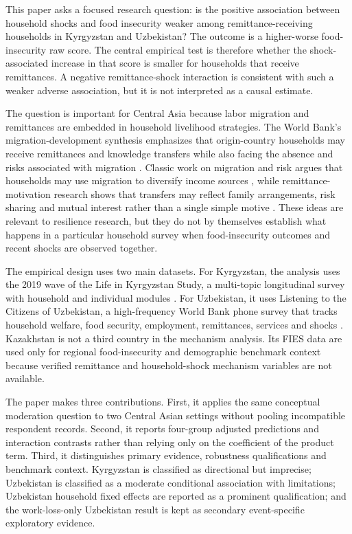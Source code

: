 \documentclass[11pt]{article}
\begin{document}
This paper asks a focused research question: is the positive association between household shocks and food insecurity weaker among remittance-receiving households in Kyrgyzstan and Uzbekistan? The outcome is a higher-worse food-insecurity raw score. The central empirical test is therefore whether the shock-associated increase in that score is smaller for households that receive remittances. A negative remittance-shock interaction is consistent with such a weaker adverse association, but it is not interpreted as a causal estimate.

The question is important for Central Asia because labor migration and remittances are embedded in household livelihood strategies. The World Bank's migration-development synthesis emphasizes that origin-country households may receive remittances and knowledge transfers while also facing the absence and risks associated with migration \parencite{WorldBank2023}. Classic work on migration and risk argues that households may use migration to diversify income sources \parencite{StarkLevhari1982}, while remittance-motivation research shows that transfers may reflect family arrangements, risk sharing and mutual interest rather than a single simple motive \parencite{LucasStark1985}. These ideas are relevant to resilience research, but they do not by themselves establish what happens in a particular household survey when food-insecurity outcomes and recent shocks are observed together.

The empirical design uses two main datasets. For Kyrgyzstan, the analysis uses the 2019 wave of the Life in Kyrgyzstan Study, a multi-topic longitudinal survey with household and individual modules \parencite{LIK2023}. For Uzbekistan, it uses Listening to the Citizens of Uzbekistan, a high-frequency World Bank phone survey that tracks household welfare, food security, employment, remittances, services and shocks \parencite{WorldBank2025a,WorldBank2025b}. Kazakhstan is not a third country in the mechanism analysis. Its FIES data are used only for regional food-insecurity and demographic benchmark context because verified remittance and household-shock mechanism variables are not available.

The paper makes three contributions. First, it applies the same conceptual moderation question to two Central Asian settings without pooling incompatible respondent records. Second, it reports four-group adjusted predictions and interaction contrasts rather than relying only on the coefficient of the product term. Third, it distinguishes primary evidence, robustness qualifications and benchmark context. Kyrgyzstan is classified as directional but imprecise; Uzbekistan is classified as a moderate conditional association with limitations; Uzbekistan household fixed effects are reported as a prominent qualification; and the work-loss-only Uzbekistan result is kept as secondary event-specific exploratory evidence.
\end{document}
